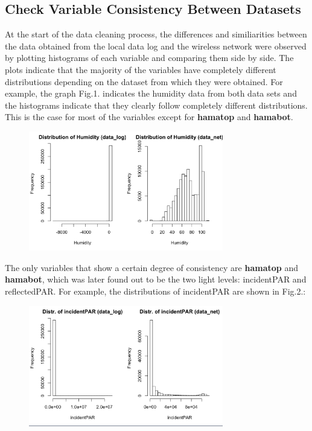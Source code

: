 \documentclass[twocolumn,11pt]{asme2ej}
\begin{document}
\subsection{Check Variable Consistency Between Datasets}

At the start of the data cleaning process, the differences and similiarities between the data obtained from the local data log and the wireless network were observed by plotting histograms of each variable and comparing them side by side. The plots indicate that the majority of the variables have completely different distributions depending on the dataset from which they were obtained. For example, the graph Fig.1. indicates the humidity data from both data sets and the histograms indicate that they clearly follow completely different distributions. This is the case for most of the variables except for \textbf{hamatop}  and \textbf{hamabot}.  

\begin{figure}
    \centering
    \includegraphics[width=85mm]{2a.png}
    \caption{}
    \label{fig:2a}
\end{figure}


The only variables that show a certain degree of consistency are  \textbf{hamatop}  and \textbf{hamabot}, which was later found out to be the two light levels: incidentPAR and reflectedPAR. For example, the distributions of incidentPAR are shown in Fig.2.:  

\begin{figure}
    \centering
    \includegraphics[width=85mm]{2a2.png} 
    \caption{}
    \label{fig:2a2}
\end{figure}
\end{document}
